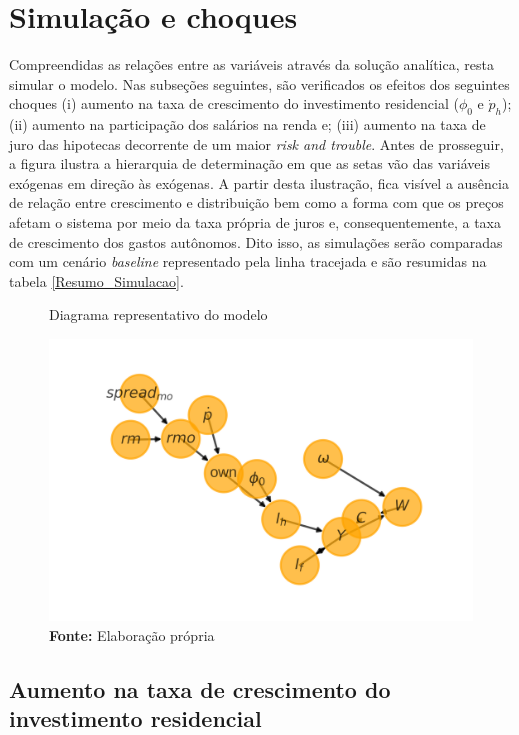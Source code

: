 \section{Simulação e choques}
\label{SecChoques}

Compreendidas as relações entre as variáveis através da solução analítica, resta simular o modelo. Nas subseções seguintes, são verificados os efeitos dos seguintes choques
(i) aumento na taxa de crescimento do investimento residencial ($\phi_0$ e $\dot p_h$); (ii) aumento na participação dos salários na renda e;  (iii) aumento na taxa de juro das hipotecas decorrente de um maior \textit{risk and trouble}. Antes de prosseguir, a figura \label{DAG} ilustra a hierarquia de determinação em que as setas vão das variáveis exógenas em direção às exógenas. A partir desta ilustração, fica visível a ausência de relação entre crescimento e distribuição bem como a forma com que os preços afetam o sistema por meio da taxa própria de juros e, consequentemente, a taxa de crescimento dos gastos autônomos. Dito isso, as simulações serão comparadas com um cenário \textit{baseline} representado pela linha tracejada e são resumidas na tabela \ref{Resumo_Simulacao}.

\begin{figure}[H]
	\centering
	\label{DAG}
	\caption{Diagrama representativo do modelo}
	\includegraphics{../../Modelo/Versoes/Dag.png}
	\caption*{\textbf{Fonte:} Elaboração própria}
\end{figure}



\subsection*{Aumento na taxa de crescimento do investimento residencial}

